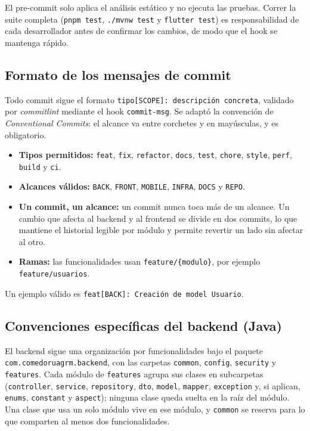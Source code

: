 El pre-commit solo aplica el análisis estático y no ejecuta las pruebas. Correr la suite completa (\texttt{pnpm test}, \texttt{./mvnw test} y \texttt{flutter test}) es responsabilidad de cada desarrollador antes de confirmar los cambios, de modo que el hook se mantenga rápido.

\subsection{Formato de los mensajes de commit}

Todo commit sigue el formato \texttt{tipo[SCOPE]: descripción concreta}, validado por \textit{commitlint} mediante el hook \texttt{commit-msg}. Se adaptó la convención de \textit{Conventional Commits}: el alcance va entre corchetes y en mayúsculas, y es obligatorio.

\begin{itemize}
    \item \textbf{Tipos permitidos:} \texttt{feat}, \texttt{fix}, \texttt{refactor}, \texttt{docs}, \texttt{test}, \texttt{chore}, \texttt{style}, \texttt{perf}, \texttt{build} y \texttt{ci}.
    \item \textbf{Alcances válidos:} \texttt{BACK}, \texttt{FRONT}, \texttt{MOBILE}, \texttt{INFRA}, \texttt{DOCS} y \texttt{REPO}.
    \item \textbf{Un commit, un alcance:} un commit nunca toca más de un alcance. Un cambio que afecta al backend y al frontend se divide en dos commits, lo que mantiene el historial legible por módulo y permite revertir un lado sin afectar al otro.
    \item \textbf{Ramas:} las funcionalidades usan \texttt{feature/\{modulo\}}, por ejemplo \texttt{feature/usuarios}.
\end{itemize}

Un ejemplo válido es \texttt{feat[BACK]: Creación de model Usuario}.

\subsection{Convenciones específicas del backend (Java)}

El backend sigue una organización por funcionalidades bajo el paquete \texttt{com.comedoruagrm.backend}, con las carpetas \texttt{common}, \texttt{config}, \texttt{security} y \texttt{features}. Cada módulo de \texttt{features} agrupa sus clases en subcarpetas (\texttt{controller}, \texttt{service}, \texttt{repository}, \texttt{dto}, \texttt{model}, \texttt{mapper}, \texttt{exception} y, si aplican, \texttt{enums}, \texttt{constant} y \texttt{aspect}); ninguna clase queda suelta en la raíz del módulo. Una clase que usa un solo módulo vive en ese módulo, y \texttt{common} se reserva para lo que comparten al menos dos funcionalidades.

